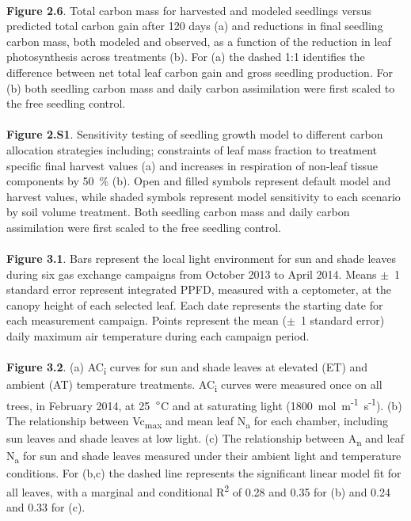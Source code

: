 \documentclass[a4paper]{article}
\begin{document}
\\
\textbf{Figure 2.6}. Total carbon mass for harvested and modeled seedlings versus predicted total carbon gain after 120 days (a) and  reductions in final seedling carbon mass, both modeled and observed, as a function of the reduction in leaf photosynthesis across treatments (b). For (a) the dashed 1:1 identifies the difference between net total leaf carbon gain and gross seedling production. For (b) both seedling carbon mass and daily carbon assimilation were first scaled to the free seedling control.
\\
\\
\textbf{Figure 2.S1}. Sensitivity testing of seedling growth model to different carbon allocation strategies including; constraints of leaf mass fraction to treatment specific final harvest values (a) and increases in respiration of non-leaf tissue components by 50~\% (b). Open and filled symbols represent default model and harvest values, while shaded symbols represent model sensitivity to each scenario by soil volume treatment. Both seedling carbon mass and daily carbon assimilation were first scaled to the free seedling control.
\\
\\
\textbf{Figure 3.1}. Bars represent the local light environment for sun and shade leaves during six gas exchange campaigns from October 2013 to April 2014. Means $\pm$~1 standard error represent integrated PPFD, measured with a ceptometer, at the canopy height of each selected leaf. Each date represents the starting date for each measurement campaign. Points represent the mean ($\pm$~1 standard error) daily maximum air temperature during each campaign period.
\\
\\
\textbf{Figure 3.2}. (a) AC\textsubscript{i} curves for sun and shade leaves at elevated (ET) and ambient (AT) temperature treatments. AC\textsubscript{i} curves were measured once on all trees, in February 2014, at 25~$\degree$C and at saturating light (1800~{\textmugreek}mol~m\textsuperscript{-1}~s\textsuperscript{-1}). (b) The relationship between Vc\textsubscript{max} and mean leaf N\textsubscript{a} for each chamber, including sun leaves and shade leaves at low light. (c) The relationship between A\textsubscript{n} and leaf N\textsubscript{a} for sun and shade leaves measured under their ambient light and temperature conditions. For (b,c) the dashed line represents the significant linear model fit for all leaves, with a marginal and conditional R\textsuperscript{2} of 0.28 and 0.35 for (b) and 0.24 and 0.33 for (c).
\end{document}

